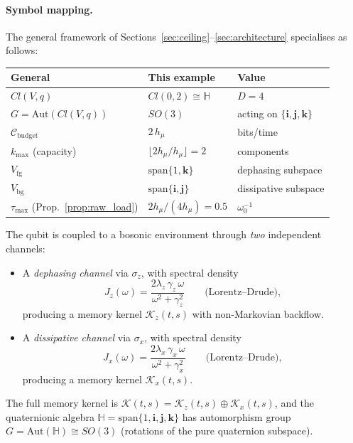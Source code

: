 \documentclass[12pt]{article}
\begin{document}
\paragraph{Symbol mapping.}
The general framework of Sections~\ref{sec:ceiling}--\ref{sec:architecture}
specialises as follows:
\begin{center}
\small
\begin{tabular}{@{}lll@{}}
\toprule
General & This example & Value \\
\midrule
$Cl(V,q)$ & $Cl(0,2) \cong \mathbb{H}$
  & $D = 4$ \\
$G = \mathrm{Aut}(Cl(V,q))$ & $SO(3)$
  & acting on $\{\mathbf{i},\mathbf{j},\mathbf{k}\}$\\
$\mathcal{C}_{\mathrm{budget}}$ & $2\,h_\mu$
  & bits/time \\
$k_{\max}$ (capacity)
  & $\lfloor 2h_\mu / h_\mu \rfloor = 2$
  & components \\
$V_{\mathrm{fg}}$ & $\mathrm{span}\{1,\mathbf{k}\}$
  & dephasing subspace \\
$V_{\mathrm{bg}}$ & $\mathrm{span}\{\mathbf{i},\mathbf{j}\}$
  & dissipative subspace \\
$\tau_{\max}$ (Prop.~\ref{prop:raw_load})
  & $2h_\mu / (4h_\mu) = 0.5$
  & $\omega_0^{-1}$ \\
\bottomrule
\end{tabular}
\end{center}
The qubit is coupled to a bosonic environment through
\emph{two} independent channels:
\begin{itemize}
\item A \emph{dephasing channel} via $\sigma_z$, with
  spectral density
  \begin{equation}
  \label{eq:J_z}
  J_z(\omega)
  = \frac{2\lambda_z\,\gamma_z\,\omega}
         {\omega^2 + \gamma_z^2}
  \qquad\text{(Lorentz--Drude)},
  \end{equation}
  producing a memory kernel $\mathcal{K}_z(t,s)$ with
  non-Markovian backflow.
\item A \emph{dissipative channel} via $\sigma_x$, with
  spectral density
  \begin{equation}
  \label{eq:J_x}
  J_x(\omega)
  = \frac{2\lambda_x\,\gamma_x\,\omega}
         {\omega^2 + \gamma_x^2}
  \qquad\text{(Lorentz--Drude)},
  \end{equation}
  producing a memory kernel $\mathcal{K}_x(t,s)$.
\end{itemize}

The full memory kernel is
$\mathcal{K}(t,s)
= \mathcal{K}_z(t,s) \oplus \mathcal{K}_x(t,s)$,
and the quaternionic algebra
$\mathbb{H} = \mathrm{span}\{1, \mathbf{i}, \mathbf{j},
\mathbf{k}\}$
has automorphism group
$G = \mathrm{Aut}(\mathbb{H}) \cong SO(3)$
(rotations of the pure quaternion subspace).
\end{document}

